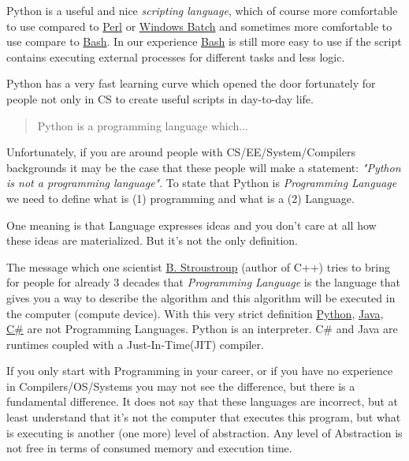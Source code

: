 \documentclass[
]{article}
\begin{document}
Python is a useful and nice \emph{scripting language}, which of course
more comfortable to use compared to
\href{https://www.perl.org/books/beginning-perl/}{Perl} or
\href{https://en.wikibooks.org/wiki/Windows_Batch_Scripting}{Windows
Batch} and sometimes more comfortable to use compare to
\href{https://www.gnu.org/savannah-checkouts/gnu/bash/manual/bash.html}{Bash}.
In our experience
\href{https://www.gnu.org/savannah-checkouts/gnu/bash/manual/bash.html}{Bash}
is still more easy to use if the script contains executing external
processes for different tasks and less logic.

Python has a very fast learning curve which opened the door fortunately
for people not only in CS to create useful scripts in day-to-day life.

\begin{quote}
Python is a programming language which...
\end{quote}

Unfortunately, if you are around people with CS/EE/System/Compilers
backgrounds it may be the case that these people will make a statement:
\emph{"Python is not a programming language"}. To state that Python is
\emph{Programming Language} we need to define what is (1) programming
and what is a (2) Language.

One meaning is that Language expresses ideas and you don't care at all
how these ideas are materialized. But it's not the only definition.

The message which one scientist
\href{https://scholar.google.com/citations?user=Rr9Y8acAAAAJ\&hl=ru\&oi=ao}{B.
Stroustroup} (author of C++) tries to bring for people for already 3
decades that \emph{Programming Language} is the language that gives you
a way to describe the algorithm and this algorithm will be executed in
the computer (compute device). With this very strict definition
\href{https://www.python.org/}{Python},
\href{https://www.java.com/}{Java},
\href{https://learn.microsoft.com/en-us/dotnet/csharp/}{C\#} are not
Programming Languages. Python is an interpreter. C\# and Java are
runtimes coupled with a Just-In-Time(JIT) compiler.

If you only start with Programming in your career, or if you have no
experience in Compilers/OS/Systems you may not see the difference, but
there is a fundamental difference. It does not say that these languages
are incorrect, but at least understand that it's not the computer that
executes this program, but what is executing is another (one more) level
of abstraction. Any level of Abstraction is not free in terms of
consumed memory and execution time.
\end{document}
